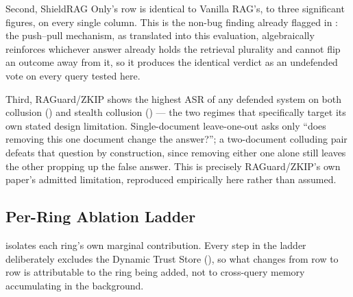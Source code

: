 Second, ShieldRAG Only's row is identical to Vanilla RAG's, to three
significant figures, on every single column. This is the non-bug finding
already flagged in : the push--pull mechanism, as
translated into this evaluation, algebraically reinforces whichever answer
already holds the retrieval plurality and cannot flip an outcome away from
it, so it produces the identical verdict as an undefended vote on every
query tested here.

Third, RAGuard/ZKIP shows the highest ASR of any defended system on both
collusion () and stealth collusion () ---
the two regimes that specifically target its own stated design limitation.
Single-document leave-one-out asks only ``does removing this one document
change the answer?''; a two-document colluding pair defeats that question
by construction, since removing either one alone still leaves the other
propping up the false answer. This is precisely RAGuard/ZKIP's own paper's
admitted limitation, reproduced empirically here rather than assumed.

\subsection{Per-Ring Ablation Ladder}
\label{sec:ablation-results}

 isolates each ring's own marginal contribution. Every
step in the ladder deliberately excludes the Dynamic Trust Store
(), so what changes from row to row is attributable
to the ring being added, not to cross-query memory accumulating in the
background.

\begin{table}[htbp]
\centering
\small
{}
\caption{Per-ring ablation ladder, Dynamic Trust Store deliberately excluded --- same 8 seeds as .}
\label{tab:ablation}
\end{table}

